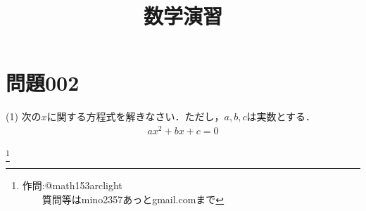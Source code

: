 \documentclass[12pt]{jarticle}
\title{数学演習}
\date{}
\begin{document}
\maketitle
{}
\section*{問題002}

(1) 次の$x$に関する方程式を解きなさい．ただし，$a, b, c$は実数とする．\begin{eqnarray*}
ax^{2}+bx+c=0 
\end{eqnarray*}

\footnote[0]{
作問:@math153arclight\\
　　質問等はmino2357あっとgmail.comまで
}

\thispagestyle{empty}
\end{document}
